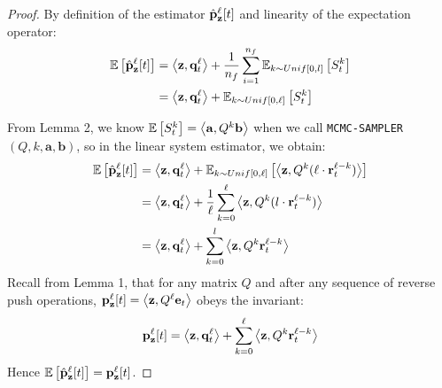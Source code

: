 \begin{proof}
By definition of the estimator $\hat{\mathbf{p}}_\mathbf{z}^{\ell}[t]$ and linearity of the expectation operator:
\begin{align*}
\mathbb{E}\left[\hat{\mathbf{p}}_\mathbf{z}^{\ell}[t]\right] &= \left<\mathbf{z}, \mathbf{q}_t^{\ell} \right> + \frac{1}{n_f}\sum_{i=1}^{n_f} \mathbb{E}_{k \sim Unif[0, l]}\left[S_{t}^{k}\right] \\
&= \left<\mathbf{z}, \mathbf{q}_t^{\ell} \right> + \mathbb{E}_{k \sim Unif[0, \ell]}\left[S_{t}^{k}\right]
\end{align*}

From Lemma 2, we know $\mathbb{E}\left[S_{t}^{k}\right] = \left< \mathbf{a}, Q^k \mathbf{b} \right>$ when we call \texttt{MCMC-SAMPLER}$(Q, k, \mathbf{a}, \mathbf{b})$, so in the linear system estimator, we obtain: 
\begin{align*}
\mathbb{E}\left[\hat{\mathbf{p}}_\mathbf{z}^{\ell}[t] \right] &= \left<\mathbf{z}, \mathbf{q}_t^{\ell} \right> + \mathbb{E}_{k \sim Unif[0, \ell]} \left[\left< \mathbf{z}, Q^k ( \ell \cdot \mathbf{r}_t^{\ell-k}) \right> \right] \\
&= \left<\mathbf{z}, \mathbf{q}_t^{\ell} \right> + \frac{1}{\ell} \sum_{k = 0}^\ell\left< \mathbf{z}, Q^k ( l \cdot \mathbf{r}_t^{\ell-k} ) \right>\\
&= \left<\mathbf{z}, \mathbf{q}_t^{\ell} \right> + \sum_{k = 0}^l\left< \mathbf{z}, Q^k\mathbf{r}_t^{\ell-k} \right>
\end{align*}
Recall from Lemma 1, that for any matrix $Q$ and after any sequence of reverse push operations, $\mathbf{p}_{\mathbf{z}}^{\ell}[t] = \left<\mathbf{z}, Q^{\ell} \mathbf{e}_t \right>$ obeys the invariant: 
$${\mathbf{p}}_\mathbf{z}^{\ell}[t] = \left<\mathbf{z}, \mathbf{q}_t^{\ell} \right> + \sum_{k=0}^{\ell} \left<\mathbf{z}, Q^k\mathbf{r}_t^{\ell-k}\right>$$
Hence $\mathbb{E}\left[\hat{\mathbf{p}}_\mathbf{z}^{\ell}[t] \right] = {\mathbf{p}}_\mathbf{z}^{\ell}[t]$.
\end{proof}
